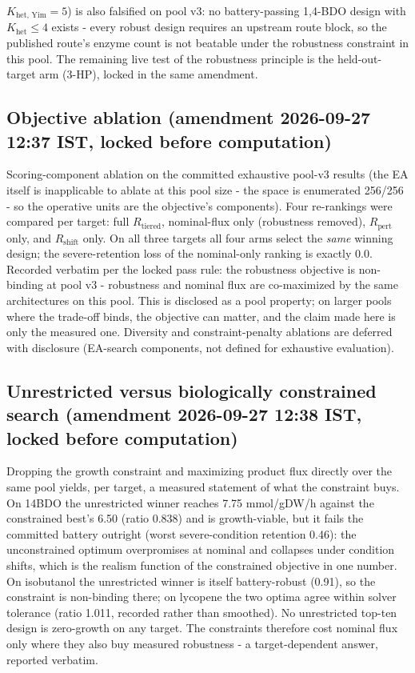 \documentclass[12pt,a4paper]{article}
\begin{document}
$K_{\mathrm{het,\,Yim}} = 5$) is also falsified on pool v3: no battery-passing 1,4-BDO design with $K_{\mathrm{het}} \le 4$ exists - every robust design requires an upstream route block, so the published route's enzyme count is not beatable under the robustness constraint in this pool. The remaining live test of the robustness principle is the held-out-target arm (3-HP), locked in the same amendment.

\subsection{Objective ablation (amendment 2026-09-27 12:37 IST, locked before computation)}
Scoring-component ablation on the committed exhaustive pool-v3 results (the EA itself is inapplicable to ablate at this pool size - the space is enumerated 256/256 - so the operative units are the objective's components). Four re-rankings were compared per target: full $R_{\mathrm{tiered}}$, nominal-flux only (robustness removed), $R_{\mathrm{pert}}$ only, and $R_{\mathrm{shift}}$ only. On all three targets all four arms select the \emph{same} winning design; the severe-retention loss of the nominal-only ranking is exactly 0.0. Recorded verbatim per the locked pass rule: the robustness objective is non-binding at pool v3 - robustness and nominal flux are co-maximized by the same architectures on this pool. This is disclosed as a pool property; on larger pools where the trade-off binds, the objective can matter, and the claim made here is only the measured one. Diversity and constraint-penalty ablations are deferred with disclosure (EA-search components, not defined for exhaustive evaluation).

\subsection{Unrestricted versus biologically constrained search (amendment 2026-09-27 12:38 IST, locked before computation)}
Dropping the growth constraint and maximizing product flux directly over the same pool yields, per target, a measured statement of what the constraint buys. On 14BDO the unrestricted winner reaches 7.75 mmol/gDW/h against the constrained best's 6.50 (ratio 0.838) and is growth-viable, but it fails the committed battery outright (worst severe-condition retention 0.46): the unconstrained optimum overpromises at nominal and collapses under condition shifts, which is the realism function of the constrained objective in one number. On isobutanol the unrestricted winner is itself battery-robust (0.91), so the constraint is non-binding there; on lycopene the two optima agree within solver tolerance (ratio 1.011, recorded rather than smoothed). No unrestricted top-ten design is zero-growth on any target. The constraints therefore cost nominal flux only where they also buy measured robustness - a target-dependent answer, reported verbatim.
\end{document}
